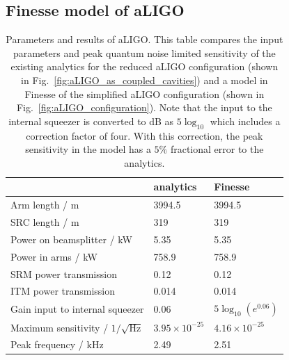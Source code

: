 \documentclass[aps,pra,superscriptaddress,reprint,nofootinbib]{revtex4-1}
\begin{document}
\subsection{Finesse model of aLIGO}

\begin{table}[ht]
	\centering
	\begin{tabular}{l|ll}
	 & analytics & Finesse \\ \hline
	Arm length / m & 3994.5 & 3994.5 \\
	SRC length / m & 319 & 319 \\
	Power on beamsplitter / kW & 5.35 & 5.35 \\
	Power in arms / kW & 758.9 & 758.9 \\
	SRM power transmission & 0.12 & 0.12 \\
	ITM power transmission & 0.014 & 0.014 \\
	Gain input to internal squeezer & 0.06 & $5 \log_{10}(e^{0.06})$ \\ \hline
	Maximum sensitivity / $1/\sqrt{\mathrm{Hz}}$ & $3.95 \times 10^{-25}$ & $4.16 \times 10^{-25}$ \\
	Peak frequency / kHz & 2.49 & 2.51
	\end{tabular}%
	\caption{Parameters and results of aLIGO. This table compares the input parameters and peak quantum noise limited sensitivity of the existing analytics for the reduced aLIGO configuration (shown in Fig.~\ref{fig:aLIGO_as_coupled_cavities}) and a model in Finesse of the simplified aLIGO configuration (shown in Fig.~\ref{fig:aLIGO_configuration}). Note that the input to the internal squeezer is converted to dB as $5 \log_{10}$ which includes a correction factor of four. With this correction, the peak sensitivity in the model has a $5\%$ fractional error to the analytics.}
	\label{tab:aLIGO_parameters}
\end{table}
\end{document}
